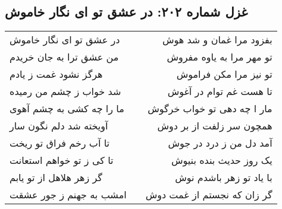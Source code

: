 \begin{center}
\section*{غزل شماره ۲۰۲: در عشق تو ای نگار خاموش}
\label{sec:202}
\begin{longtable}{l p{0.5cm} r}
در عشق تو ای نگار خاموش
&&
بفزود مرا غمان و شد هوش
\\
من عشق ترا به جان خریدم
&&
تو مهر مرا به یاوه مفروش
\\
هرگز نشود غمت ز یادم
&&
تو نیز مرا مکن فراموش
\\
شد خواب ز چشم من رمیده
&&
تا هست غم توام در آغوش
\\
ما را چه کشی به چشم آهوی
&&
مار ا چه دهی تو خواب خرگوش
\\
آویخته شد دلم نگون سار
&&
همچون سر زلفت از بر دوش
\\
تا آب رخم فراق تو ریخت
&&
آمد دل من ز درد در جوش
\\
تا کی ز تو خواهم استعانت
&&
یک روز حدیث بنده بنیوش
\\
گر زهر هلاهل از تو یابم
&&
با یاد تو زهر باشدم نوش
\\
امشب به جهنم ز جور عشقت
&&
گر زان که نجستم از غمت دوش
\\
\end{longtable}
\end{center}
